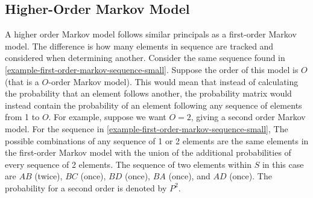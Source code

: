 \unfinished


























\subsection{Higher-Order Markov Model}

A higher order Markov model follows similar principals as a first-order Markov model. The difference is how many elements in sequence are tracked and considered when determining another. Consider the same sequence found in \ref{example-first-order-markov-sequence-small}.
Suppose the order of this model is $O$ (that is a $O$-order Markov model). This would mean that instead of calculating the probability that an element follows another, the probability matrix would instead contain the probability of an element following any sequence of elements from 1 to $O$. For example, suppose we want $O=2$, giving a second order Markov model. For the sequence in \ref{example-first-order-markov-sequence-small}, The possible combinations of any sequence of 1 or 2 elements are the same elements in the first-order Markov model with the union of the additional probabilities of every sequence of 2 elements. The sequence of two elements within $S$ in this case are $AB$ (twice), $BC$ (once), $BD$ (once), $BA$ (once), and $AD$ (once). The probability for a second order is denoted by $P^2$. 



